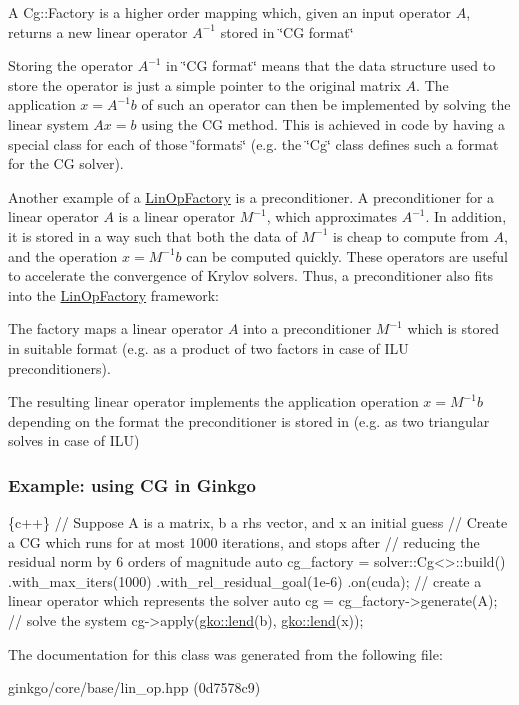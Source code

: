 \begin{DoxyItemize}
\item A Cg\+::\+Factory is a higher order mapping which, given an input operator $A$, returns a new linear operator $A^{-1}$ stored in \char`\"{}\+C\+G
    format\char`\"{}
\item Storing the operator $A^{-1}$ in \char`\"{}\+C\+G format\char`\"{} means that the data structure used to store the operator is just a simple pointer to the original matrix $A$. The application $x = A^{-1}b$ of such an operator can then be implemented by solving the linear system $Ax = b$ using the CG method. This is achieved in code by having a special class for each of those \char`\"{}formats\char`\"{} (e.\+g. the \char`\"{}\+Cg\char`\"{} class defines such a format for the CG solver).
\end{DoxyItemize}

Another example of a \hyperlink{classgko_1_1LinOpFactory}{Lin\+Op\+Factory} is a preconditioner. A preconditioner for a linear operator $A$ is a linear operator $M^{-1}$, which approximates $A^{-1}$. In addition, it is stored in a way such that both the data of $M^{-1}$ is cheap to compute from $A$, and the operation $x = M^{-1}b$ can be computed quickly. These operators are useful to accelerate the convergence of Krylov solvers. Thus, a preconditioner also fits into the \hyperlink{classgko_1_1LinOpFactory}{Lin\+Op\+Factory} framework\+:


\begin{DoxyItemize}
\item The factory maps a linear operator $A$ into a preconditioner $M^{-1}$ which is stored in suitable format (e.\+g. as a product of two factors in case of I\+LU preconditioners).
\item The resulting linear operator implements the application operation $x = M^{-1}b$ depending on the format the preconditioner is stored in (e.\+g. as two triangular solves in case of I\+LU)
\end{DoxyItemize}

\subsubsection*{Example\+: using CG in Ginkgo }


\begin{DoxyCode}
\{c++\}
\textcolor{comment}{// Suppose A is a matrix, b a rhs vector, and x an initial guess}
\textcolor{comment}{// Create a CG which runs for at most 1000 iterations, and stops after}
\textcolor{comment}{// reducing the residual norm by 6 orders of magnitude}
\textcolor{keyword}{auto} cg\_factory = solver::Cg<>::build()
    .with\_max\_iters(1000)
    .with\_rel\_residual\_goal(1e-6)
    .on(cuda);
\textcolor{comment}{// create a linear operator which represents the solver}
\textcolor{keyword}{auto} cg = cg\_factory->generate(A);
\textcolor{comment}{// solve the system}
cg->apply(\hyperlink{namespacegko_aa8cb4876b72e5e1036ea9575443c439b}{gko::lend}(b), \hyperlink{namespacegko_aa8cb4876b72e5e1036ea9575443c439b}{gko::lend}(x));
\end{DoxyCode}
 

The documentation for this class was generated from the following file\+:\begin{DoxyCompactItemize}
\item 
ginkgo/core/base/lin\+\_\+op.\+hpp (0d7578c9)\end{DoxyCompactItemize}
